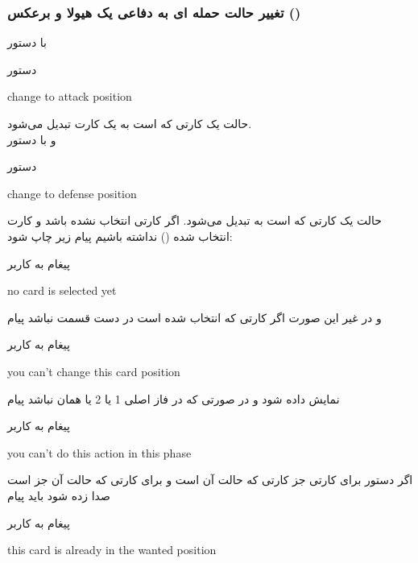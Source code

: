 \documentclass[]{article}
\begin{document}
\subsubsection*{{\titr تغییر حالت حمله ای به دفاعی یک هیولا و برعکس 
()}}
    با دستور
\begin{mybox}[colback=yellow]{دستور}
	\begin{latin}	
		change to attack position
	\end{latin}
\end{mybox}
حالت یک کارتی که  است به یک کارت  تبدیل می‌شود.
\\
و با دستور
\begin{mybox}[colback=yellow]{دستور}
	\begin{latin}	
	    change to defense position
	\end{latin}
\end{mybox}
    حالت یک کارتی که  است به  تبدیل می‌شود.
    اگر کارتی انتخاب نشده باشد و کارت انتخاب شده () نداشته 
    باشیم پیام زیر چاپ شود:
\begin{mybox}[colback=yellow]{پیغام به کاربر}
	\begin{latin}	
		no card is selected yet
	\end{latin}
\end{mybox}
و در غیر این صورت اگر کارتی که انتخاب شده است در دست قسمت
 نباشد پیام
\begin{mybox}[colback=yellow]{پیغام به کاربر}
\begin{latin}	
	you can’t change this card position
\end{latin}
\end{mybox}
نمایش داده شود و در صورتی که در فاز اصلی 1 یا 2 یا همان  
نباشد پیام
\begin{mybox}[colback=yellow]{پیغام به کاربر}
	\begin{latin}	
		you can’t do this action in this phase
	\end{latin}
\end{mybox}
اگر دستور  برای کارتی جز کارتی که حالت آن  است و 
 برای کارتی که حالت آن جز  است صدا زده شود باید 
پیام
\begin{mybox}[colback=yellow]{پیغام به کاربر}
	\begin{latin}	
	    this card is already in the wanted position		
	\end{latin}
\end{mybox}
\end{document}

